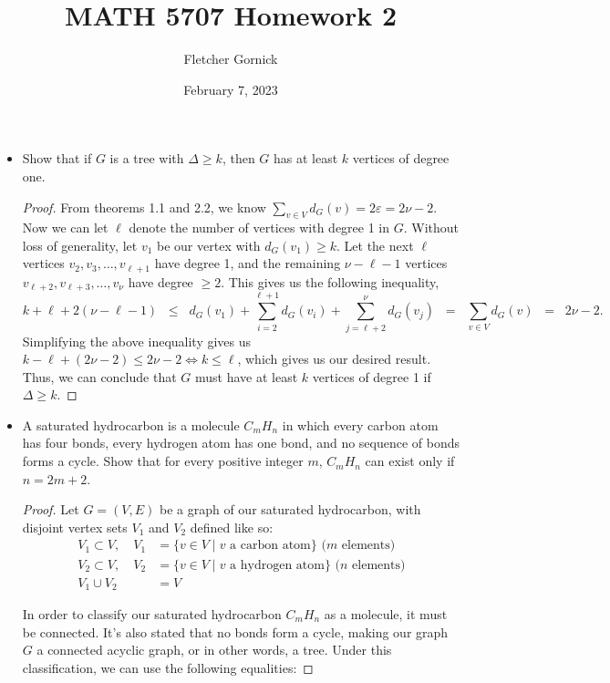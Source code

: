 \documentclass[11pt]{article}
\title{\vspace{-1.0cm}MATH 5707 Homework 2}
\author{Fletcher Gornick}
\date{February 7, 2023}
\newcommand\itm[1]{\item[\textbf{#1}]}
\begin{document}
\maketitle
\begin{itemize}
  \itm{2.1.6} Show that if \(G\) is a tree with \(\Delta \geq k\), then \(G\) has at least \(k\) vertices of degree one.
  \begin{proof}
    From theorems 1.1 and 2.2, we know \(\displaystyle\sum_{v \in V} d_G(v) = 2\varepsilon = 2\nu - 2.\)
    Now we can let \(\ell\) denote the number of vertices with degree 1 in \(G\).  Without loss of generality, let \(v_1\) be our vertex with \(d_G(v_1) \geq k\).  Let the next \(\ell\) vertices \(v_2,v_3,\hdots,v_{\ell + 1}\) have degree 1, and the remaining \(\nu - \ell - 1\) vertices \(v_{\ell+2}, v_{\ell+3}, \hdots, v_{\nu}\) have degree \(\geq 2\).  This gives us the following inequality,
    \[k + \ell + 2(\nu - \ell - 1) \;\;\leq\;\; d_G(v_1) + \sum_{i=2}^{\ell + 1} d_G(v_i) + \sum_{j=\ell+2}^{\nu} d_G(v_j) \;\;=\;\; \sum_{v \in V} d_G(v) \;\;=\;\; 2\nu - 2.\]
    Simplifying the above inequality gives us \(k - \ell + (2\nu - 2) \leq 2\nu - 2 \iff k \leq \ell\), which gives us our desired result.  Thus, we can conclude that \(G\) must have at least \(k\) vertices of degree 1 if \(\Delta \geq k\).
  \end{proof}
  



  \itm{2.1.12} A saturated hydrocarbon is a molecule \(C_m H_n\) in which every carbon atom has four bonds, every hydrogen atom has one bond, and no sequence of bonds forms a cycle.  Show that for every positive integer \(m\), \(C_m H_n\) can exist only if \(n = 2m + 2\).
  \begin{proof}
    Let \(G = (V, E)\) be a graph of our saturated hydrocarbon, with disjoint vertex sets \(V_1\) and \(V_2\) defined like so:
    \begin{align*}
      V_1 \subset V, \quad V_1 &= \{v \in V \mid v \text{ a carbon atom}\}  \text{ (\(m\) elements)} \\
      V_2 \subset V, \quad V_2 &= \{v \in V \mid v \text{ a hydrogen atom}\}  \text{ (\(n\) elements)} \\
      V_1 \cup V_2 &= V
    \end{align*}

    In order to classify our saturated hydrocarbon \(C_m H_n\) as a molecule, it must be connected.  It's also stated that no bonds form a cycle, making our graph \(G\) a connected acyclic graph, or in other words, a tree.  Under this classification, we can use the following equalities:


\end{proof}
\end{itemize}
\end{document}
